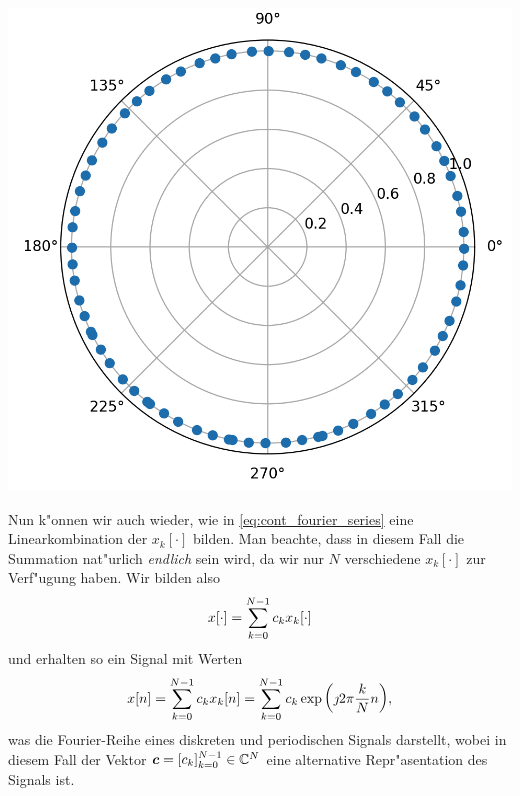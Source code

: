 \begin{listing}
\begin{minipage}{0.3\textwidth}
        \includegraphics[width=\textwidth]{code/disc_harms_comp_e.png}
    \end{minipage}
    \label{py:disc_harms_comp}
\end{listing}

Nun k"onnen wir auch wieder, wie in \eqref{eq:cont_fourier_series} eine Linearkombination der $x_k[\cdot]$ bilden.
Man beachte, dass in diesem Fall die Summation nat"urlich \emph{endlich} sein wird, da wir nur $N$ verschiedene $x_k[\cdot]$ zur Verf"ugung haben.
Wir bilden also
\[
    x[\cdot] = {\sum\limits_{k = 0}^{N-1}{c_k x_k[\cdot]}}
\]
und erhalten so ein Signal mit Werten
\begin{equation}\label{eq:disc_fourier_series}
    x[n] 
        = {\sum\limits_{k = 0}^{N-1}{c_k x_k[n]}} 
        = {\sum\limits_{k = 0}^{N-1}{
            c_k \exp\left(
                \jmath 2 \pi \frac{k}{N} n
            \right) 
        }},
\end{equation}
was die Fourier-Reihe eines diskreten und periodischen Signals darstellt, wobei in diesem Fall der Vektor $\bm c = [c_k]_{k=0}^{N-1} \in \mathbb{C}^N$ eine alternative Repr"asentation des Signals ist.

